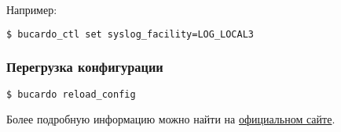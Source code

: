 Например:

\begin{lstlisting}[language=Bash,label=lst:bucardo15,caption=Изменения значений конфигурации]
$ bucardo_ctl set syslog_facility=LOG_LOCAL3
\end{lstlisting}

\subsubsection{Перегрузка конфигурации}

\begin{lstlisting}[language=Bash,label=lst:bucardo16,caption=Перегрузка конфигурации]
$ bucardo reload_config
\end{lstlisting}

Более подробную информацию можно найти на \href{http://bucardo.org/}{официальном сайте}.